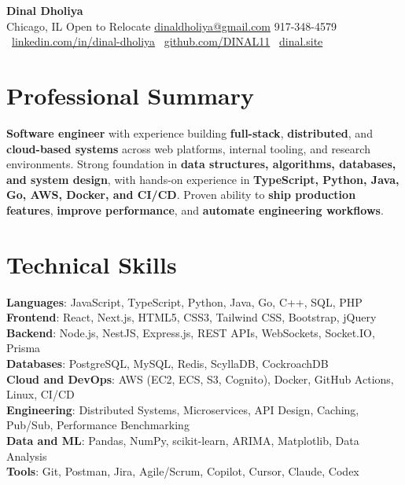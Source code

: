 \documentclass[letterpaper,10pt]{article}
\newcommand{\resumeSkill}[2]{
  \textbf{#1}: #2 \\
}
\begin{document}
\begin{center}
  {\fontsize{22}{24}\selectfont \textbf{Dinal Dholiya}} \\
  \vspace{6pt}
  Chicago, IL \textbar{} Open to Relocate \textbar{}
  \href{mailto:dinaldholiya@gmail.com}{dinaldholiya@gmail.com} \textbar{}
  917-348-4579 \\
  \vspace{4pt}
  \faLinkedin\ \href{https://linkedin.com/in/dinal-dholiya}{linkedin.com/in/dinal-dholiya}
  \hspace{10pt}
  \faGithub\ \href{https://github.com/DINAL11}{github.com/DINAL11}
  \hspace{10pt}
  \faGlobe\ \href{https://dinal.site}{dinal.site}
\end{center}

\section{Professional Summary}
\RaggedRight
\textbf{Software engineer} with experience building \textbf{full-stack}, \textbf{distributed}, and \textbf{cloud-based systems} across web platforms, internal tooling, and research environments. Strong foundation in \textbf{data structures, algorithms, databases, and system design}, with hands-on experience in \textbf{TypeScript, Python, Java, Go, AWS, Docker, and CI/CD}. Proven ability to \textbf{ship production features}, \textbf{improve performance}, and \textbf{automate engineering workflows}.

\section{Technical Skills}
\resumeSkill{Languages}{JavaScript, TypeScript, Python, Java, Go, C++, SQL, PHP}
\resumeSkill{Frontend}{React, Next.js, HTML5, CSS3, Tailwind CSS, Bootstrap, jQuery}
\resumeSkill{Backend}{Node.js, NestJS, Express.js, REST APIs, WebSockets, Socket.IO, Prisma}
\resumeSkill{Databases}{PostgreSQL, MySQL, Redis, ScyllaDB, CockroachDB}
\resumeSkill{Cloud and DevOps}{AWS (EC2, ECS, S3, Cognito), Docker, GitHub Actions, Linux, CI/CD}
\resumeSkill{Engineering}{Distributed Systems, Microservices, API Design, Caching, Pub/Sub, Performance Benchmarking}
\resumeSkill{Data and ML}{Pandas, NumPy, scikit-learn, ARIMA, Matplotlib, Data Analysis}
\resumeSkill{Tools}{Git, Postman, Jira, Agile/Scrum, Copilot, Cursor, Claude, Codex}
\end{document}
